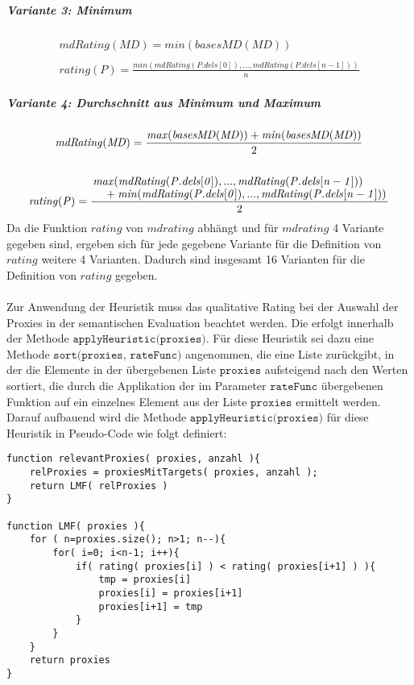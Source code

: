 \documentclass[a4paper,12pt]{article}
\begin{document}
\subparagraph{Variante 3: Minimum}

\begin{gather*}
\mathit{mdRating(MD)} = \mathit{min(basesMD(MD))}
\\\\
\mathit{rating(P)} = \frac{\mathit{min(mdRating(P.dels[0]),...,mdRating(P.dels[n-1]))}}{n}
\end{gather*}

\subparagraph{Variante 4: Durchschnitt aus Minimum und Maximum}

\begin{gather*}
\mathit{mdRating(MD)} = \frac{\mathit{max(basesMD(MD))}+\mathit{min(basesMD(MD))}}{2}
\\\\
\mathit{rating(P)} = \frac{\splitfrac{ \mathit{max(mdRating(P.dels[0]),...,mdRating(P.dels[n-1]))}}{+\mathit{min(mdRating(P.dels[0]),...,mdRating(P.dels[n-1]))}}}{2}
\end{gather*}
\noindent
Da die Funktion $\mathit{rating}$ von $\mathit{mdrating}$ abhängt und für $\mathit{mdrating}$ 4 Variante gegeben sind, ergeben sich für jede gegebene Variante für die Definition von $\mathit{rating}$ weitere 4 Varianten. Dadurch sind insgesamt 16 Varianten für die Definition von $\mathit{rating}$ gegeben.\\\\

Zur Anwendung der Heuristik muss das qualitative Rating bei der Auswahl der Proxies in der semantischen Evaluation beachtet werden. Die erfolgt innerhalb der Methode $\texttt{applyHeuristic(proxies)}$. Für diese Heuristik sei dazu eine Methode $\texttt{sort(proxies, rateFunc)}$ angenommen, die eine Liste zurückgibt, in der die Elemente in der übergebenen Liste $\texttt{proxies}$ aufsteigend nach den Werten sortiert, die durch die Applikation der im Parameter $\texttt{rateFunc}$ übergebenen Funktion auf ein einzelnes Element aus der Liste $\texttt{proxies}$ ermittelt werden. Darauf aufbauend wird die Methode $\texttt{applyHeuristic(proxies)}$ für diese Heuristik in Pseudo-Code wie folgt definiert:

\begin{lstlisting}[style = pseudo]
function relevantProxies( proxies, anzahl ){
	relProxies = proxiesMitTargets( proxies, anzahl );
	return LMF( relProxies )
}

function LMF( proxies ){
	for	( n=proxies.size(); n>1; n--){
		for( i=0; i<n-1; i++){
			if( rating( proxies[i] ) < rating( proxies[i+1] ) ){
				tmp = proxies[i]
				proxies[i] = proxies[i+1]
				proxies[i+1] = tmp
			}
		}
	}	
	return proxies
}
\end{lstlisting}
\end{document}
